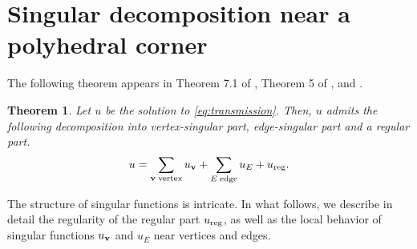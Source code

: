 ﻿\documentclass[11pt,reqno,oneside]{amsart}
\newtheorem{theorem}{Theorem}[section]
\theoremstyle{definition}
\theoremstyle{remark}
\begin{document}
\section{Singular decomposition near a polyhedral corner}\label{sec:singular}

The following theorem appears in Theorem 7.1 of \cite{Dauge1999}, Theorem 5 of \cite{Nicaise1999}, and \cite{Costabel1999}.

\begin{theorem}\label{th:SingDecom}
   Let $u$ be the solution to \eqref{eq:transmission}. Then, $u$ admits the following decomposition into vertex-singular part, edge-singular part and a regular part.
   \begin{align}\label{eq:SingDecom}
        u=\sum_{{\bf v}\;{\rm vertex}} u_{{\bf v}}+\sum_{E \;{\rm edge}} u_E+u_{\rm reg}.
    \end{align}
\end{theorem}
The structure of singular functions is intricate. In what follows, we describe in detail the regularity of the regular part $u_{\rm reg}$, as well as the local behavior of singular functions $u_{{\bf v}}$ and $u_E$ near vertices and edges.
\end{document}
